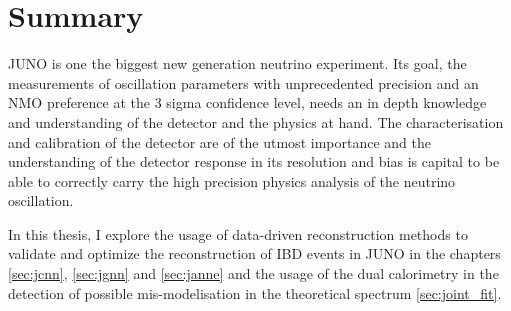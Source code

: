 \documentclass[../main.tex]{subfiles}
\begin{document}
\section{Summary}

JUNO is one the biggest new generation neutrino experiment. Its goal, the measurements of oscillation parameters with unprecedented precision and an NMO preference at the 3 sigma confidence level, needs an in depth knowledge and understanding of the detector and the physics at hand. The characterisation and calibration of the detector are of the utmost importance and the understanding of the detector response in its resolution and bias is capital to be able to correctly carry the high precision physics analysis of the neutrino oscillation.

In this thesis, I explore the usage of data-driven reconstruction methods to validate and optimize the reconstruction of IBD events in JUNO in the chapters \ref{sec:jcnn}, \ref{sec:jgnn} and \ref{sec:janne} and the usage of the dual calorimetry in the detection of possible mis-modelisation in the theoretical spectrum \ref{sec:joint_fit}.
\end{document}
